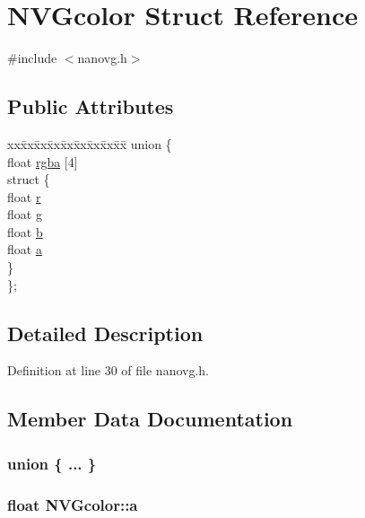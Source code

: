 \hypertarget{struct_n_v_gcolor}{\section{N\+V\+Gcolor Struct Reference}
\label{struct_n_v_gcolor}
}


{\ttfamily \#include $<$nanovg.\+h$>$}

\subsection*{Public Attributes}
\begin{DoxyCompactItemize}
\item 
\begin{tabbing}
xx\=xx\=xx\=xx\=xx\=xx\=xx\=xx\=xx\=\kill
union \{\\
\>float \hyperlink{struct_n_v_gcolor_aa1091c72571ef92c4915c1efb6fd1a36}{rgba} \mbox{[}4\mbox{]}\\
\>struct \{\\
\>\>float \hyperlink{struct_n_v_gcolor_a5fbafce12dbdd10bdd886aae9157588d}{r}\\
\>\>float \hyperlink{struct_n_v_gcolor_a03d55a20cd1abd6b1e91f9d7c6c0c29a}{g}\\
\>\>float \hyperlink{struct_n_v_gcolor_a61c93a869a5e02b2983b0fc72df4dbb4}{b}\\
\>\>float \hyperlink{struct_n_v_gcolor_a3cc22c161da763b5fa7ffa3ec7e68433}{a}\\
\>\} \\
\}; \\

\end{tabbing}\end{DoxyCompactItemize}


\subsection{Detailed Description}


Definition at line 30 of file nanovg.\+h.



\subsection{Member Data Documentation}
\hypertarget{struct_n_v_gcolor_a38e48f771e5314c60c3b3e2b1ece0d80}{\subsubsection[{"@25}]{\setlength{\rightskip}{0pt plus 5cm}union \{ ... \} }}\label{struct_n_v_gcolor_a38e48f771e5314c60c3b3e2b1ece0d80}
\hypertarget{struct_n_v_gcolor_a3cc22c161da763b5fa7ffa3ec7e68433}{
\subsubsection[{a}]{\setlength{\rightskip}{0pt plus 5cm}float N\+V\+Gcolor\+::a}}\label{struct_n_v_gcolor_a3cc22c161da763b5fa7ffa3ec7e68433}


